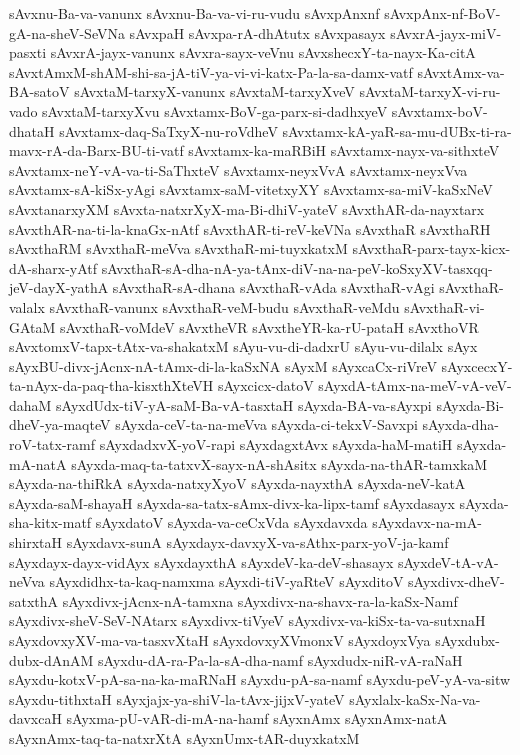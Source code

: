 {sAvxnu-Ba-va-vanunx
sAvxnu-Ba-va-vi-ru-vudu
sAvxpAnxnf
sAvxpAnx-nf-BoV-gA-na-sheV-SeVNa
sAvxpaH
sAvxpa-rA-dhAtutx
sAvxpasayx
sAvxrA-jayx-miV-pasxti
sAvxrA-jayx-vanunx
sAvxra-sayx-veVnu
sAvxshecxY-ta-nayx-Ka-citA
sAvxtAmxM-shAM-shi-sa-jA-tiV-ya-vi-vi-katx-Pa-la-sa-damx-vatf
sAvxtAmx-va-BA-satoV
sAvxtaM-tarxyX-vanunx
sAvxtaM-tarxyXveV
sAvxtaM-tarxyX-vi-ru-vado
sAvxtaM-tarxyXvu
sAvxtamx-BoV-ga-parx-si-dadhxyeV
sAvxtamx-boV-dhataH
sAvxtamx-daq-SaTxyX-nu-roVdheV
sAvxtamx-kA-yaR-sa-mu-dUBx-ti-ra-mavx-rA-da-Barx-BU-ti-vatf
sAvxtamx-ka-maRBiH
sAvxtamx-nayx-va-sithxteV
sAvxtamx-neY-vA-va-ti-SaThxteV
sAvxtamx-neyxVvA
sAvxtamx-neyxVva
sAvxtamx-sA-kiSx-yAgi
sAvxtamx-saM-vitetxyXY
sAvxtamx-sa-miV-kaSxNeV
sAvxtanarxyXM
sAvxta-natxrXyX-ma-Bi-dhiV-yateV
sAvxthAR-da-nayxtarx
sAvxthAR-na-ti-la-knaGx-nAtf
sAvxthAR-ti-reV-keVNa
sAvxthaR
sAvxthaRH
sAvxthaRM
sAvxthaR-meVva
sAvxthaR-mi-tuyxkatxM
sAvxthaR-parx-tayx-kicx-dA-sharx-yAtf
sAvxthaR-sA-dha-nA-ya-tAnx-diV-na-na-peV-koSxyXV-tasxqq-jeV-dayX-yathA
sAvxthaR-sA-dhana
sAvxthaR-vAda
sAvxthaR-vAgi
sAvxthaR-valalx
sAvxthaR-vanunx
sAvxthaR-veM-budu
sAvxthaR-veMdu
sAvxthaR-vi-GAtaM
sAvxthaR-voMdeV
sAvxtheVR
sAvxtheYR-ka-rU-pataH
sAvxthoVR
sAvxtomxV-tapx-tAtx-va-shakatxM
sAyu-vu-di-dadxrU
sAyu-vu-dilalx
sAyx
sAyxBU-divx-jAcnx-nA-tAmx-di-la-kaSxNA
sAyxM
sAyxcaCx-riVreV
sAyxcecxY-ta-nAyx-da-paq-tha-kisxthXteVH
sAyxcicx-datoV
sAyxdA-tAmx-na-meV-vA-veV-dahaM
sAyxdUdx-tiV-yA-saM-Ba-vA-tasxtaH
sAyxda-BA-va-sAyxpi
sAyxda-Bi-dheV-ya-maqteV
sAyxda-ceV-ta-na-meVva
sAyxda-ci-tekxV-Savxpi
sAyxda-dha-roV-tatx-ramf
sAyxdadxvX-yoV-rapi
sAyxdagxtAvx
sAyxda-haM-matiH
sAyxda-mA-natA
sAyxda-maq-ta-tatxvX-sayx-nA-shAsitx
sAyxda-na-thAR-tamxkaM
sAyxda-na-thiRkA
sAyxda-natxyXyoV
sAyxda-nayxthA
sAyxda-neV-katA
sAyxda-saM-shayaH
sAyxda-sa-tatx-sAmx-divx-ka-lipx-tamf
sAyxdasayx
sAyxda-sha-kitx-matf
sAyxdatoV
sAyxda-va-ceCxVda
sAyxdavxda
sAyxdavx-na-mA-shirxtaH
sAyxdavx-sunA
sAyxdayx-davxyX-va-sAthx-parx-yoV-ja-kamf
sAyxdayx-dayx-vidAyx
sAyxdayxthA
sAyxdeV-ka-deV-shasayx
sAyxdeV-tA-vA-neVva
sAyxdidhx-ta-kaq-namxma
sAyxdi-tiV-yaRteV
sAyxditoV
sAyxdivx-dheV-satxthA
sAyxdivx-jAcnx-nA-tamxna
sAyxdivx-na-shavx-ra-la-kaSx-Namf
sAyxdivx-sheV-SeV-NAtarx
sAyxdivx-tiVyeV
sAyxdivx-va-kiSx-ta-va-sutxnaH
sAyxdovxyXV-ma-va-tasxvXtaH
sAyxdovxyXVmonxV
sAyxdoyxVya
sAyxdubx-dubx-dAnAM
sAyxdu-dA-ra-Pa-la-sA-dha-namf
sAyxdudx-niR-vA-raNaH
sAyxdu-kotxV-pA-sa-na-ka-maRNaH
sAyxdu-pA-sa-namf
sAyxdu-peV-yA-va-sitw
sAyxdu-tithxtaH
sAyxjajx-ya-shiV-la-tAvx-jijxV-yateV
sAyxlalx-kaSx-Na-va-davxcaH
sAyxma-pU-vAR-di-mA-na-hamf
sAyxnAmx
sAyxnAmx-natA
sAyxnAmx-taq-ta-natxrXtA
sAyxnUmx-tAR-duyxkatxM
}
